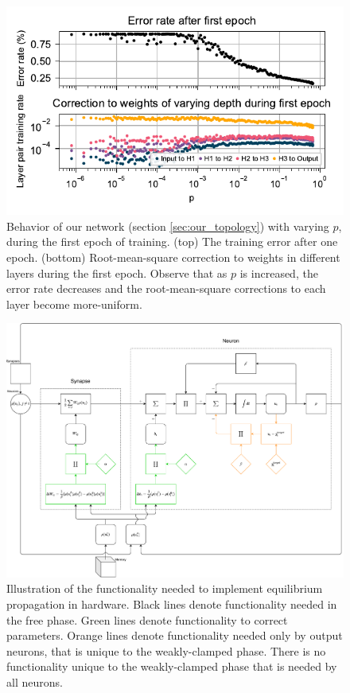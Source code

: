 \documentclass[utf8]{frontiersSCNS}
\begin{document}
\begin{figure}[h!]
\begin{center}
\includegraphics[width=\columnwidth]{figures/MNIST_one_epoch_performance.pdf}
\end{center}
\caption{Behavior of our network (section \ref{sec:our_topology}) with varying $p$, during the first epoch of training. (top) The training error after one epoch. (bottom) Root-mean-square correction to weights in different layers during the first epoch. Observe that as $p$ is increased, the error rate decreases and the root-mean-square corrections to each layer become more-uniform.} \label{fig:mnist_1epoch}
\end{figure}
\begin{figure}[h!]
\begin{center}
\includegraphics[width=\textwidth]{figures/eqp_bd.pdf}
\end{center}
\caption{Illustration of the functionality needed to implement equilibrium propagation in hardware. Black lines denote functionality needed in the free phase. Green lines denote functionality to correct parameters. Orange lines denote functionality needed only by output neurons, that is unique to the weakly-clamped phase. There is no functionality unique to the weakly-clamped phase that is needed by all neurons.} \label{fig:eqp_bd}
\end{figure}
\end{document}
